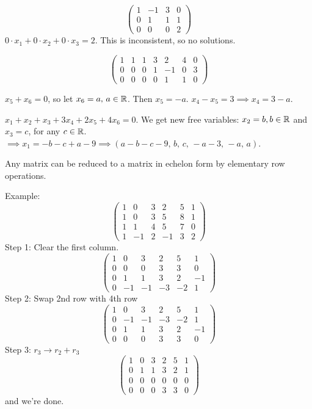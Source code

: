 \documentclass[10pt]{scrartcl}
\begin{document}
\begin{example}
\[
  \begin{pmatrix}
  1 & -1 & 3 & 0 \\
  0 & 1 & 1 & 1\\
  0 & 0 & 0 & 2	
  \end{pmatrix}
\]
$0\cdot x_1 + 0\cdot x_2 + 0\cdot x_3 = 2$. This is inconsistent, so no solutions.
\end{example}\vspace*{5pt}

\begin{example}
\[\begin{pmatrix}
1 & 1 & 1 & 3 & 2 & 4 & 0\\
0 & 0 & 0 & 1 & -1 & 0 & 3\\
0 & 0 & 0 & 0 & 1 & 1 & 0	
\end{pmatrix}\]

$x_5 + x_6 = 0$, so let $x_6 = a,\, a\in\mathbb{R}$. Then $x_5 = -a$. $x_4 - x_5 = 3 \implies x_4 = 3-a$. 

$x_1 + x_2 + x_3 + 3x_4 + 2x_5 + 4x_6 = 0$. We get new free variables: $x_2 = b, b\in\mathbb{R}$ and $x_3 = c$, for any $c\in\mathbb{R}$. $\implies x_1 = -b -c + a -9 \implies (a-b-c-9,\, b,\, c,\, -a -3,\, -a,\,a)$.
\end{example}\vspace*{5pt}

\begin{theorem}
	Any matrix can be reduced to a matrix in echelon form by elementary row operations.
\end{theorem}

Example: 
\[
  \begin{pmatrix}
  1 & 0 & 3 & 2 & 5 & 1\\
  1 & 0 & 3 & 5 & 8 & 1\\
  1 & 1 & 4 & 5 & 7 &0\\
  1 & -1 & 2 & -1 & 3 & 2 	
  \end{pmatrix}
\]
Step 1: Clear the first column. 
\[
  \begin{pmatrix}
  1 & 0 & 3 & 2 & 5 & 1\\
  0 & 0 & 0 & 3 & 3 & 0 \\
  0 & 1 & 1 & 3 & 2 & -1\\
  0 & -1 & -1 & -3 & -2 & 1
  \end{pmatrix}
\]
Step 2: Swap 2nd row with 4th row
\[
  \begin{pmatrix}
  1 & 0 & 3 & 2 & 5 & 1\\
  0 & -1 & -1 & -3 & -2 & 1\\
  0 & 1 & 1 & 3 & 2 & -1\\
  0 & 0 & 0 & 3 & 3 & 0	
  \end{pmatrix}
\]
Step 3: $r_3 \longrightarrow r_2 + r_3$
\[
  \begin{pmatrix}
  1 & 0 & 3 & 2 &5 & 1\\
  0 & 1 & 1 & 3 & 2 & 1\\
  0 & 0 & 0 & 0 & 0 & 0 \\
  0 & 0 & 0 & 3 & 3 & 0	
  \end{pmatrix}
\]
and we're done. 
\end{document}
